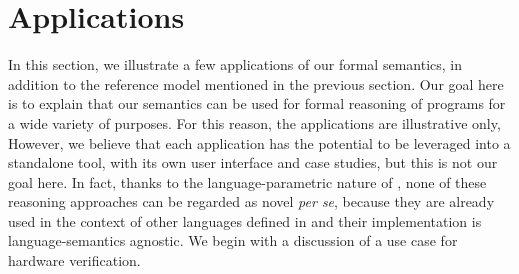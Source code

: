\section{Applications} \label{sec:Appl}

In this section, we illustrate a few applications of our formal semantics, in addition to the reference model mentioned in the previous section.
Our goal here is to explain that our semantics can be used for formal reasoning of \ISA programs for a wide variety of purposes.
For this reason, the applications are illustrative only, 
However, we believe that each application has the potential to be leveraged into a standalone tool, with its own user interface and case studies, %
but this is not our goal here.
In fact, thanks to the language-parametric nature of \K, none of these reasoning approaches can be regarded as novel {\it per se}, because they are already used in the context of other languages defined in \K and their implementation is language-semantics agnostic.
%
We begin with a discussion of a use case for hardware verification.



